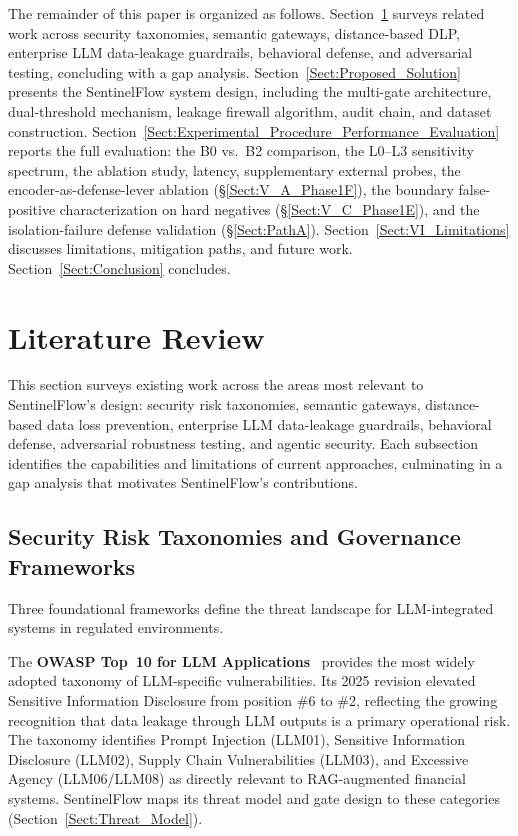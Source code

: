 \documentclass[journal]{IEEEtran}
\begin{document}
The remainder of this paper is organized as follows. Section~\ref{Sect:Literature_Review} surveys related work across security taxonomies, semantic gateways, distance-based DLP, enterprise LLM data-leakage guardrails, behavioral defense, and adversarial testing, concluding with a gap analysis. Section~\ref{Sect:Proposed_Solution} presents the SentinelFlow system design, including the multi-gate architecture, dual-threshold mechanism, leakage firewall algorithm, audit chain, and dataset construction. Section~\ref{Sect:Experimental_Procedure_Performance_Evaluation} reports the full evaluation: the B0 vs.\ B2 comparison, the L0--L3 sensitivity spectrum, the ablation study, latency, supplementary external probes, the encoder-as-defense-lever ablation (\S\ref{Sect:V_A_Phase1F}), the boundary false-positive characterization on hard negatives (\S\ref{Sect:V_C_Phase1E}), and the isolation-failure defense validation (\S\ref{Sect:PathA}). Section~\ref{Sect:VI_Limitations} discusses limitations, mitigation paths, and future work. Section~\ref{Sect:Conclusion} concludes.

\section{Literature Review}
\label{Sect:Literature_Review}
%

This section surveys existing work across the areas most relevant to SentinelFlow's design: security risk taxonomies, semantic gateways, distance-based data loss prevention, enterprise LLM data-leakage guardrails, behavioral defense, adversarial robustness testing, and agentic security. Each subsection identifies the capabilities and limitations of current approaches, culminating in a gap analysis that motivates SentinelFlow's contributions.

\subsection{Security Risk Taxonomies and Governance Frameworks}
\label{Sect:LR_Taxonomies}

Three foundational frameworks define the threat landscape for LLM-integrated systems in regulated environments.

The \textbf{OWASP Top~10 for LLM Applications}~\cite{owasp_llm_2025} provides the most widely adopted taxonomy of LLM-specific vulnerabilities. Its 2025 revision elevated Sensitive Information Disclosure from position \#6 to \#2, reflecting the growing recognition that data leakage through LLM outputs is a primary operational risk. The taxonomy identifies Prompt Injection (LLM01), Sensitive Information Disclosure (LLM02), Supply Chain Vulnerabilities (LLM03), and Excessive Agency (LLM06/LLM08) as directly relevant to RAG-augmented financial systems. SentinelFlow maps its threat model and gate design to these categories (Section~\ref{Sect:Threat_Model}).
\end{document}
